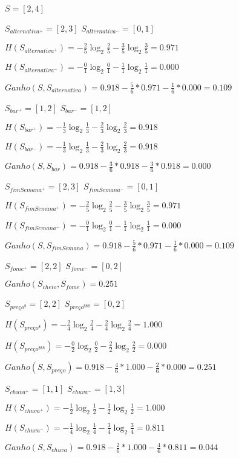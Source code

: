 
\par $S = [2,4]$

\vskip 0.3in
\par $S_{alternativa^+} = [2,3]$ \qquad $S_{alternativa^-} = [0,1]$
\par $H(S_{alternativa^+}) = -\frac{2}{5} \log_2 \frac{2}{5}- \frac{3}{5} \log_2 \frac{3}{5} = 0.971$
\par $H(S_{alternativa^-}) = -\frac{0}{1} \log_2 \frac{0}{1}- \frac{1}{1} \log_2 \frac{1}{1} = 0.000$
\par $Ganho(S, S_{alternativa}) = 0.918-\frac{5}{6} * 0.971-\frac{1}{6} * 0.000 = 0.109$

\vskip 0.3in
\par $S_{bar^+} = [1,2]$ \qquad $S_{bar^-} = [1,2]$
\par $H(S_{bar^+}) = -\frac{1}{3} \log_2 \frac{1}{3}- \frac{2}{3} \log_2 \frac{2}{3} = 0.918$
\par $H(S_{bar^-}) = -\frac{1}{3} \log_2 \frac{1}{3}- \frac{2}{3} \log_2 \frac{2}{3} = 0.918$
\par $Ganho(S, S_{bar}) = 0.918-\frac{3}{6} * 0.918-\frac{3}{6} * 0.918 = 0.000$

\vskip 1in
\par $S_{fimSemana^+} = [2,3]$ \qquad $S_{fimSemana^-} = [0,1]$
\par $H(S_{fimSemana^+}) = -\frac{2}{5} \log_2 \frac{2}{5}- \frac{3}{5} \log_2 \frac{3}{5} = 0.971$
\par $H(S_{fimSemana^-}) = -\frac{0}{1} \log_2 \frac{0}{1}- \frac{1}{1} \log_2 \frac{1}{1} = 0.000$
\par $Ganho(S, S_{fimSemana}) = 0.918-\frac{5}{6} * 0.971-\frac{1}{6} * 0.000 = 0.109$

\vskip 0.3in
\par $S_{fome^+} = [2,2]$ \qquad   $S_{fome^-} = [0,2]$
\par $Ganho(S_{cheio}, S_{fome}) = 0.251$

\vskip 0.3in
\par $S_{preço^{\$}} = [2,2]$ \qquad $S_{preço^{\$\$\$}} = [0,2]$
\par $H(S_{preço^{\$}}) = -\frac{2}{4} \log_2 \frac{2}{4}- \frac{2}{4} \log_2 \frac{2}{4} = 1.000$
\par $H(S_{preço^{\$\$\$}}) = -\frac{0}{2} \log_2 \frac{0}{2}- \frac{2}{2} \log_2 \frac{2}{2} = 0.000$
\par $Ganho(S, S_{preço}) = 0.918-\frac{4}{6} * 1.000-\frac{2}{6} * 0.000 = 0.251$

\vskip 0.3in
\par $S_{chuva^+} = [1,1]$ \qquad $S_{chuva^-} = [1,3]$
\par $H(S_{chuva^+}) = -\frac{1}{2} \log_2 \frac{1}{2}- \frac{1}{2} \log_2 \frac{1}{2} = 1.000$
\par $H(S_{chuva^-}) = -\frac{1}{4} \log_2 \frac{1}{4}- \frac{3}{4} \log_2 \frac{3}{4} = 0.811$
\par $Ganho(S, S_{chuva}) = 0.918-\frac{2}{6} * 1.000-\frac{4}{6} * 0.811 = 0.044$

